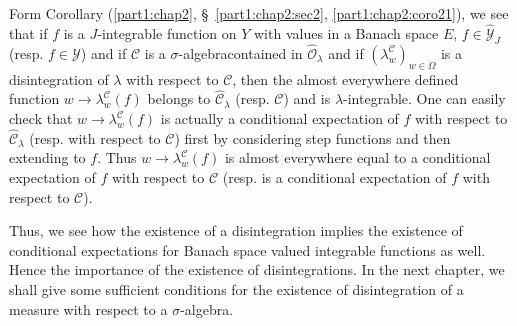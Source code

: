 Form Corollary (\ref{part1:chap2}, \S\ \ref{part1:chap2:sec2},
\ref{part1:chap2:coro21}), we see that if $f$ is a $J$-integrable 
function on $Y$ with values in a Banach space $E$, $f \in
\hat{\mathscr{Y}}_J$ (resp. $f \in\mathscr{Y}$) and if $\mathscr{C}$
is a $\sigma$-algebra\pageoriginale contained in
$\hat{\mathscr{O}}_\lambda$ and if $(\lambda^\mathscr{C}_w)_{w \in
  \Omega}$ is a disintegration of $\lambda$ with respect to
$\mathscr{C}$, then the almost everywhere defined function $w \to
\lambda^\mathscr{C}_w (f)$ belongs to $\hat{\mathscr{C}}_\lambda$
(resp. $\mathscr{C}$) and is $\lambda$-integrable. One can easily
check that $w \to \lambda^\mathscr{C}_w (f)$ is actually a conditional
expectation of $f$ with respect to $\hat{\mathscr{C}}_\lambda$
(resp. with respect to $\mathscr{C}$) first by considering step
functions and then extending to $f$. Thus $w \to
\lambda^\mathscr{C}_w(f)$ is almost everywhere equal to a conditional
expectation of $f$ with respect to $\mathscr{C}$ (resp. is a
conditional expectation of $f$ with respect to $\mathscr{C}$). 

Thus, we see how the existence of a disintegration implies the
existence of conditional expectations for Banach space valued
integrable functions as well. Hence the importance of the existence of
disintegrations. In the next chapter, we shall give some sufficient
conditions for the existence of disintegration of a measure with
respect to a $\sigma$-algebra. 

